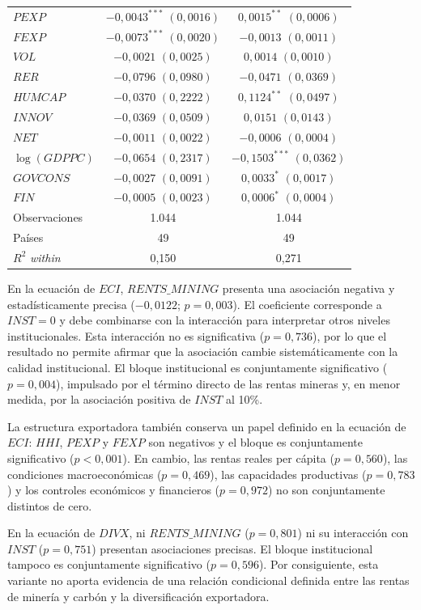 \documentclass[../../TFM.tex]{subfiles}
\begin{document}
\begin{longtable}{p{}cc}
    $PEXP$ & $-0,0043^{***}$ $(0,0016)$ & $0,0015^{**}$ $(0,0006)$ \\
    $FEXP$ & $-0,0073^{***}$ $(0,0020)$ & $-0,0013$ $(0,0011)$ \\
    $VOL$ & $-0,0021$ $(0,0025)$ & $0,0014$ $(0,0010)$ \\
    $RER$ & $-0,0796$ $(0,0980)$ & $-0,0471$ $(0,0369)$ \\
    $HUMCAP$ & $-0,0370$ $(0,2222)$ & $0,1124^{**}$ $(0,0497)$ \\
    $INNOV$ & $-0,0369$ $(0,0509)$ & $0,0151$ $(0,0143)$ \\
    $NET$ & $-0,0011$ $(0,0022)$ & $-0,0006$ $(0,0004)$ \\
    $\log(GDPPC)$ & $-0,0654$ $(0,2317)$ & $-0,1503^{***}$ $(0,0362)$ \\
    $GOVCONS$ & $-0,0027$ $(0,0091)$ & $0,0033^{*}$ $(0,0017)$ \\
    $FIN$ & $-0,0005$ $(0,0023)$ & $0,0006^{*}$ $(0,0004)$ \\
    \midrule
    Observaciones & 1.044 & 1.044 \\
    Países & 49 & 49 \\
    $R^2$ \textit{within} & 0,150 & 0,271 \\
\end{longtable}
\endgroup

En la ecuación de $ECI$, $RENTS\_MINING$ presenta una asociación negativa y
estadísticamente precisa ($-0,0122$; $p=0,003$). El coeficiente corresponde a
$INST=0$ y debe combinarse con la interacción para interpretar otros niveles
institucionales. Esta interacción no es significativa ($p=0,736$), por lo que el
resultado no permite afirmar que la asociación cambie sistemáticamente con la
calidad institucional. El bloque institucional es conjuntamente significativo
($p=0,004$), impulsado por el término directo de las rentas mineras y, en menor
medida, por la asociación positiva de $INST$ al 10\%.

La estructura exportadora también conserva un papel definido en la ecuación de
$ECI$: $HHI$, $PEXP$ y $FEXP$ son negativos y el bloque es conjuntamente
significativo ($p<0,001$). En cambio, las rentas reales per cápita
($p=0,560$), las condiciones macroeconómicas ($p=0,469$), las capacidades
productivas ($p=0,783$) y los controles económicos y financieros ($p=0,972$)
no son conjuntamente distintos de cero.

En la ecuación de $DIVX$, ni $RENTS\_MINING$ ($p=0,801$) ni su interacción con
$INST$ ($p=0,751$) presentan asociaciones precisas. El bloque institucional
tampoco es conjuntamente significativo ($p=0,596$). Por consiguiente, esta
variante no aporta evidencia de una relación condicional definida entre las
rentas de minería y carbón y la diversificación exportadora.
\end{document}
